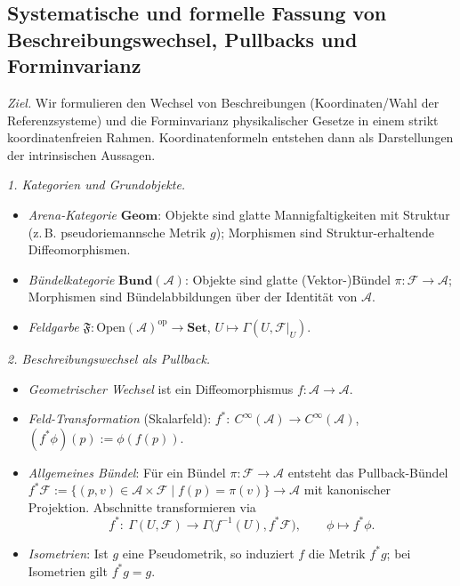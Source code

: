 \documentclass[10pt, letterpaper]{article}
\begin{document}
\pagebreak

\subsection{Systematische und formelle Fassung von Beschreibungswechsel, Pullbacks und Forminvarianz}

\emph{Ziel.}
Wir formulieren den Wechsel von Beschreibungen (Koordinaten/Wahl der Referenzsysteme) und die
Forminvarianz physikalischer Gesetze in einem strikt koordinatenfreien Rahmen. Koordinatenformeln
entstehen dann als Darstellungen der intrinsischen Aussagen.

\bigskip
\emph{1. Kategorien und Grundobjekte.}
\begin{itemize}
\item \emph{Arena-Kategorie} $\mathbf{Geom}$: Objekte sind glatte Mannigfaltigkeiten mit Struktur
(z.\,B. pseudo\-riemann\-sche Metrik $g$); Morphismen sind Struktur-erhaltende Diffeomorphismen.
\item \emph{Bündelkategorie} $\mathbf{Bund}(\mathcal A)$: Objekte sind glatte (Vektor-)Bündel $\pi:\mathcal F\to\mathcal A$;
Morphismen sind Bündelabbildungen über der Identität von $\mathcal A$.
\item \emph{Feldgarbe} $\mathfrak F:\mathrm{Open}(\mathcal A)^{\mathrm{op}}\to\mathbf{Set}$,
$U\mapsto \Gamma(U,\mathcal F|_U)$.
\end{itemize}

\bigskip
\emph{2. Beschreibungswechsel als Pullback.}
\begin{itemize}
\item \emph{Geometrischer Wechsel} ist ein Diffeomorphismus $f:\mathcal A\to\mathcal A$.
\item \emph{Feld-Transformation} (Skalarfeld): $f^*:\ C^\infty(\mathcal A)\to C^\infty(\mathcal A)$, $(f^*\phi)(p):=\phi(f(p))$.
\item \emph{Allgemeines Bündel}: Für ein Bündel $\pi:\mathcal F\to\mathcal A$ entsteht das Pullback-Bündel
$f^*\mathcal F:=\{(p,v)\in \mathcal A\times\mathcal F\mid f(p)=\pi(v)\}\to\mathcal A$ mit kanonischer Projektion.
Abschnitte transformieren via
\[
f^*:\ \Gamma(U,\mathcal F)\longrightarrow \Gamma\big(f^{-1}(U), f^*\mathcal F\big),\qquad
\phi\mapsto f^*\phi.
\]
\item \emph{Isometrien}: Ist $g$ eine Pseudo\-metrik, so induziert $f$ die Metrik $f^*g$; bei Isometrien gilt $f^*g=g$.
\end{itemize}
\end{document}
